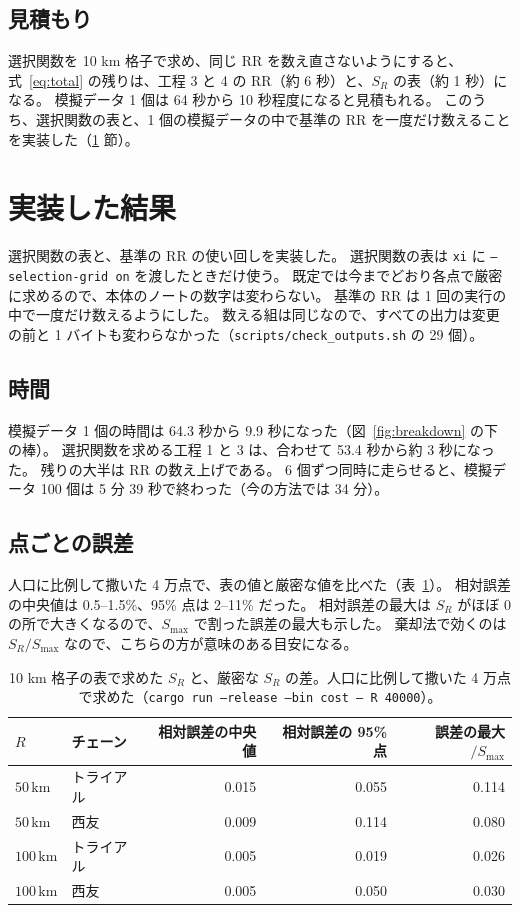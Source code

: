 \documentclass[a4paper,11pt]{ltjsarticle}
\newcommand{\code}[1]{\texttt{#1}}
\begin{document}
\subsection{見積もり}

選択関数を 10 km 格子で求め、同じ RR を数え直さないようにすると、式~\eqref{eq:total} の残りは、工程 3 と 4 の RR（約 6 秒）と、$S_R$ の表（約 1 秒）になる。
模擬データ 1 個は 64 秒から 10 秒程度になると見積もれる。
このうち、選択関数の表と、1 個の模擬データの中で基準の RR を一度だけ数えることを実装した（\ref{sec:implemented} 節）。

\section{実装した結果}
\label{sec:implemented}

選択関数の表と、基準の RR の使い回しを実装した。
選択関数の表は \code{xi} に \code{--selection-grid on} を渡したときだけ使う。
既定では今までどおり各点で厳密に求めるので、本体のノートの数字は変わらない。
基準の RR は 1 回の実行の中で一度だけ数えるようにした。
数える組は同じなので、すべての出力は変更の前と 1 バイトも変わらなかった（\code{scripts/check\_outputs.sh} の 29 個）。

\subsection{時間}

模擬データ 1 個の時間は 64.3 秒から 9.9 秒になった（図~\ref{fig:breakdown} の下の棒）。
選択関数を求める工程 1 と 3 は、合わせて 53.4 秒から約 3 秒になった。
残りの大半は RR の数え上げである。
6 個ずつ同時に走らせると、模擬データ 100 個は 5 分 39 秒で終わった（今の方法では 34 分）。

\subsection{点ごとの誤差}

人口に比例して撒いた 4 万点で、表の値と厳密な値を比べた（表~\ref{tab:tab-error}）。
相対誤差の中央値は 0.5--1.5\%、95\% 点は 2--11\% だった。
相対誤差の最大は $S_R$ がほぼ $0$ の所で大きくなるので、$S_{\max}$ で割った誤差の最大も示した。
棄却法で効くのは $S_R / S_{\max}$ なので、こちらの方が意味のある目安になる。
\begin{table}[t]
  \centering
  \caption{10 km 格子の表で求めた $S_R$ と、厳密な $S_R$ の差。人口に比例して撒いた 4 万点で求めた（\code{cargo run --release --bin cost -- R 40000}）。}
  \label{tab:tab-error}
  \small
  \begin{tabular}{llrrr}
    \toprule
    $R$ & チェーン & 相対誤差の中央値 & 相対誤差の 95\% 点 & 誤差の最大 $/ S_{\max}$ \\
    \midrule
    $50\,\mathrm{km}$ & トライアル & 0.015 & 0.055 & 0.114 \\
    $50\,\mathrm{km}$ & 西友 & 0.009 & 0.114 & 0.080 \\
    $100\,\mathrm{km}$ & トライアル & 0.005 & 0.019 & 0.026 \\
    $100\,\mathrm{km}$ & 西友 & 0.005 & 0.050 & 0.030 \\
    \bottomrule
  \end{tabular}
\end{table}
\end{document}
